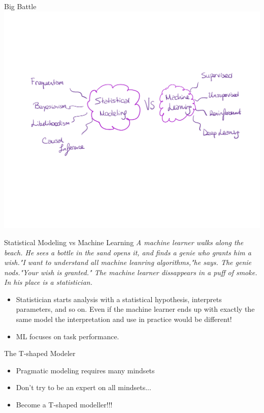 \documentclass[aspectratio=169]{beamer}
\begin{document}
\begin{frame}{Big Battle}
    \centering
  \includegraphics[scale=0.3]{figures/compare.pdf}
\end{frame}

\begin{frame}{Statistical Modeling vs Machine Learning}
  \textit{A machine learner walks along the beach. He sees a bottle in the sand opens it, and finds a genie who grants him a wish."I want to understand all machine leanring algorithms,"he says. The genie nods."Your wish is granted." The machine learner dissappears in a puff of smoke. In his place is a statistician.}
  \begin{itemize}
    \item Statistician starts analysis with a statistical hypothesis, interprets parameters, and so on. Even if the machine learner ends up with exactly the same model the interpretation and use in practice would be different!
    \item ML focuses on task performance.
  \end{itemize}
\end{frame}

\begin{frame}{The T-shaped Modeler}
  \begin{itemize}
    \item Pragmatic modeling requires many mindsets
    \item Don't try to be an expert on all mindsets...
    \item Become a T-shaped modeller!!!
  \end{itemize}
\end{frame}
\end{document}
